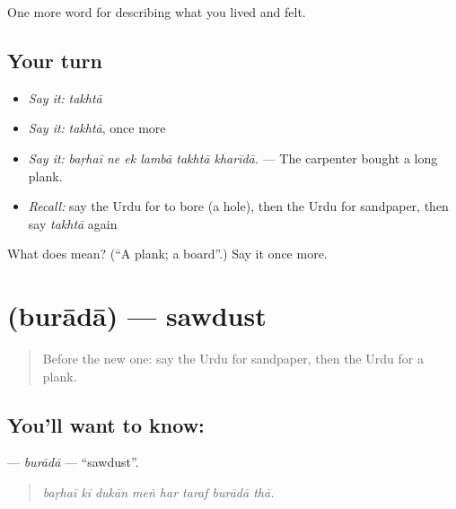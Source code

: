 \begin{grammarlens}[title={What you've built}]
One more word for describing what you lived and felt.
\end{grammarlens}

\subsection*{Your turn}
\begin{itemize}
\raggedright
  \item \emph{Say it:} \emph{takhtā}
  \item \emph{Say it:} \emph{takhtā}, once more
  \item \emph{Say it:} \emph{baṛhaī ne ek lambā takhtā kharīdā.} — The carpenter bought a long plank.
  \item \emph{Recall:} say the Urdu for to bore (a hole), then the Urdu for sandpaper, then say \emph{takhtā} again
\end{itemize}

\begin{tcolorbox}[breakable,colback=teal!4,colframe=teal!35!black,title={Before you move on}]
What does  mean? (\textquotedblleft{}A plank; a board\textquotedblright{}.) Say it once more.
\end{tcolorbox}
\section[\texorpdfstring{\ur{برادہ} (burādā)}{برادہ (burādā)}]{ (burādā) — sawdust}

\label{lesson:UR-C497-burada}



\begin{quote}
Before the new one: say the Urdu for sandpaper, then the Urdu for a plank.
\end{quote}

\subsection*{You'll want to know: }
\textbf{} — \emph{burādā} — \textquotedblleft{}sawdust\textquotedblright{}.

\begin{quote}
       
\end{quote}

\begin{quote}
\emph{baṛhaī kī dukān meṅ har taraf burādā thā.}
\end{quote}


